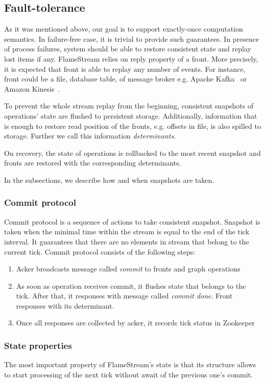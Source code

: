 \subsection{Fault-tolerance}
As it was mentioned above, our goal is to support exactly-once computation semantics. In failure-free case, it is trivial to provide such guarantees. In presence of process failures, system should be able to restore consistent state and replay lost items if any. FlameStream relies on reply property of a front. More precisely, it is expected that front is able to replay any number of events. For instance, front could be a file, database table, of message broker e.g. Apache Kafka~\cite{kreps2011kafka} or Amazon Kinesis~\cite{amazon:kinesis}. 

To prevent the whole stream replay from the beginning, consistent snapshots of operations' state are flushed to persistent storage. Additionally, information that is enough to restore read position of the fronts, e.g. offsets in file, is also spilled to storage. Further we call this information {\it determinants}.

On recovery, the state of operations is rollbacked to the most recent snapshot and fronts are restored with the corresponding determinants.

In the subsections, we describe how and when snapshots are taken.

\subsubsection{Commit protocol}
Commit protocol is a sequence of actions to take consistent snapshot. Snapshot is taken when the minimal time within the stream is equal to the end of the tick interval. It guarantees that there are no elements in stream that belong to the current tick. Commit protocol consists of the following steps: 

\begin{enumerate}
\item{Acker broadcasts message called {\it commit} to fronts and graph operations}
\item{As soon as operation receives commit, it flushes state that belongs to the tick. After that, it responses with message called {\it commit done}. Front responses with its determinant.}
\item{Once all responses are collected by acker, it records tick status in Zookeeper}
\end{enumerate}

\subsubsection{State properties}
The most important property of FlameStream's state is that its structure allows to start processing of the next tick without await of the previous one's commit. 

